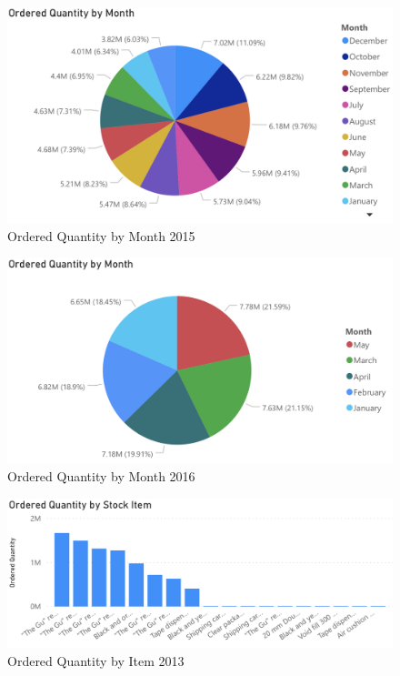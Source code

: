 \documentclass[12pt]{article}
\begin{document}
\begin{figure}[H]
    \centering
    \includegraphics [width=17.5cm]
    {images/Purchases/Ordered Quantity by Month2015.png}
    \caption{Ordered Quantity by Month 2015}
    \label{Ordered Quantity by Month 2015}
\end{figure}

\begin{figure}[H]
    \centering
    \includegraphics [width=17.5cm]
    {images/Purchases/Ordered Quantity by Month2016.png}
    \caption{Ordered Quantity by Month 2016}
    \label{Ordered Quantity by Month 2016}
\end{figure}

\begin{figure}[H]
    \centering
    \includegraphics [width=17.5cm]
    {images/Purchases/Ordered Quantity by Stock Item2013.png}
    \caption{Ordered Quantity by Item 2013}
    \label{Ordered Quantity by Item 2013}
\end{figure}
\end{document}
